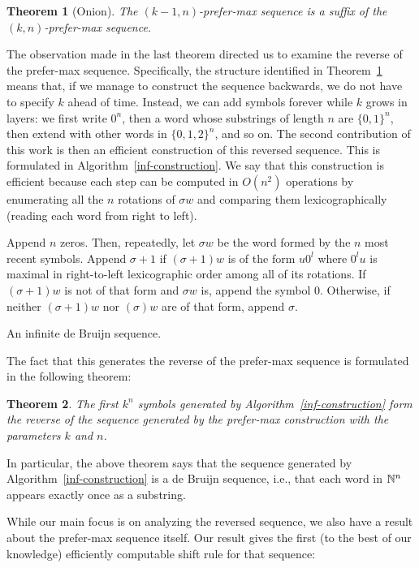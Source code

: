 \documentclass{article} %
\newtheorem{theorem}{Theorem} \newtheorem{proposition}[theorem]{Proposition}
\theoremstyle{definition} \newtheorem{definition}[theorem]{Definition}
\begin{document}
	\begin{theorem}[Onion] 
		The $(k-1,n)$-prefer-max sequence is a suffix of the
		$(k,n)$-prefer-max sequence. 
		\label{thm:onion}
	\end{theorem}
	
	The observation made in the last theorem directed us to examine the reverse of
	the prefer-max sequence. Specifically, the structure identified in
	Theorem~\ref{thm:onion} means that, if we manage to construct the sequence
	backwards, we do not have to specify $k$ ahead of time. Instead, we can add
	symbols forever while $k$ grows in layers: we first write $0^n$, then a word
	whose substrings of length $n$ are $\{0,1\}^n$, then extend with other words in
	$\{0,1,2\}^n$, and so on. The second contribution of this work is then an
	efficient construction of this reversed sequence. This is formulated in
	Algorithm~\ref{inf-construction}. We say that this construction is efficient
	because each step can be computed in $O(n^2)$ operations by enumerating all the
	$n$ rotations of $\sigma w$ and comparing them lexicographically (reading each
	word from right to left).
	
	
	\begin{algorithm}[!h] 
		Append $n$ zeros. Then, repeatedly, let $\sigma w$ be the
		word formed by the $n$ most recent symbols. Append $\sigma+1$ if $(\sigma+1)w$
		is of the form $u0^l$ where $0^lu$ is maximal in right-to-left lexicographic
		order among all of its rotations. If $(\sigma+1)w$ is not of that form and
		$\sigma w$ is, append the symbol $0$. Otherwise, if neither $(\sigma+1)w$ nor
		$(\sigma)w$ are of that form, append $\sigma$. \caption{An infinite de Bruijn
			sequence.} \label{inf-construction} 
	\end{algorithm}
	
	The fact that this generates the reverse of the prefer-max sequence is
	formulated in the following theorem:
	
	\begin{theorem} 
		The first $k^n$ symbols generated by
		Algorithm~\ref{inf-construction} form the reverse of the sequence generated by
		the prefer-max construction with the parameters $k$ and $n$. 
	\end{theorem}
	
	In particular, the above theorem says that the sequence generated by
	Algorithm~\ref{inf-construction} is a de Bruijn sequence, i.e., that each word
	in ${\mathbb{N}}^n$ appears exactly once as a substring.
	
	While our main focus is on analyzing the reversed sequence, we also have a
	result about the prefer-max sequence itself. Our result gives the first (to the
	best of our knowledge) efficiently computable shift rule for that sequence:
	
\end{document}
